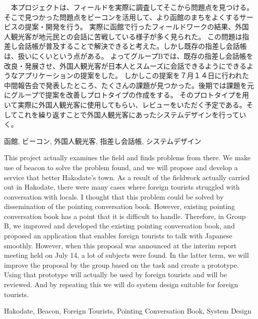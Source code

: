 \documentclass[openany,11pt,papersize]{jsbook}
\newcounter{hoge}
\newcommand{\fake}[1]{\whiledo{\thehoge<70}{#1\stepcounter{hoge}}%
  \setcounter{hoge}{0}}
\begin{document}
%
\maketitle

\frontmatter

\begin{jabstract}
  　本プロジェクトは、フィールドを実際に調査してそこから問題点を見つける。そこで見つかった問題点をビーコンを活用して、より函館のまちをよくするサービスの提案・開発を行う。
  実際に函館で行ったフィールドワークの結果、外国人観光客が地元民との会話に苦戦している様子が多く見られた。
  この問題は指差し会話帳が普及することで解決できると考えた。しかし既存の指差し会話帳は、扱いにくいという点がある。
  よってグループBでは、既存の指差し会話帳を改良・発展させ、外国人観光客が日本人とスムーズに会話できるようにできるようなアプリケーションの提案をした。
  しかしこの提案を７月１４日に行われた中間報告会で発表したところ、たくさんの課題が見つかった。後期では課題を元にグループで提案を改善しプロトタイプの作成をする。
  そのプロトタイプを用いて実際に外国人観光客に使用してもらい、レビューをいただく予定である。そしてこれを繰り返すことで外国人観光客にあったシステムデザインを行っていく。
\begin{jkeyword}
函館, ビーコン, 外国人観光客, 指差し会話帳, システムデザイン
\end{jkeyword}
\end{jabstract}

\begin{eabstract}
   This project actually examines the field and finds problems from there.
   We make use of beacon to solve the problem found, and we will propose and develop a service that better Hakodate's town.
  As a result of the fieldwork actually carried out in Hakodate, there were many cases where foreign tourists struggled with conversation with locals.
  I thought that this problem could be solved by dissemination of the pointing conversation book. However, existing pointing conversation book has a point that it is difficult to handle. Therefore, in Group B, we improved and developed the existing pointing conversation book, and proposed an application that enables foreign tourists to talk with Japanese smoothly. However, when this proposal was announced at the interim report meeting held on July 14, a lot of subjects were found. In the latter term, we will improve the proposal by the group based on the task and create a prototype. Using that prototype will actually be used by foreign tourists and will be reviewed.
  And by repeating this we will do system design suitable for foreign tourists.
\begin{ekeyword}
  Hakodate, Beacon, Foreign Tourists, Pointing Conversation Book, System Design
\end{ekeyword}
\end{eabstract}
\end{document}

